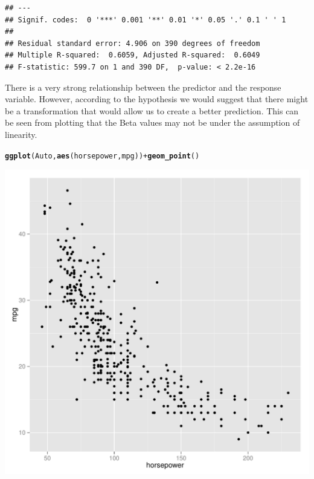 \documentclass{article}\usepackage[]{graphicx}\usepackage[]{color}
\makeatletter
\def\maxwidth{ %
  \ifdim\Gin@nat@width>\linewidth
    \linewidth
  \else
    \Gin@nat@width
  \fi
}
\newcommand{\hlopt}[1]{\textcolor[rgb]{0,0,0}{#1}}%
\newcommand{\hlstd}[1]{\textcolor[rgb]{0.345,0.345,0.345}{#1}}%
\newcommand{\hlkwd}[1]{\textcolor[rgb]{0.737,0.353,0.396}{\textbf{#1}}}%
\newenvironment{kframe}{%
 \def\at@end@of@kframe{}%
 \ifinner\ifhmode%
  \def\at@end@of@kframe{\end{minipage}}%
  \begin{minipage}{\columnwidth}%
 \fi\fi%
 \def\FrameCommand##1{\hskip\@totalleftmargin \hskip-\fboxsep
 \colorbox{shadecolor}{##1}\hskip-\fboxsep
     \hskip-\linewidth \hskip-\@totalleftmargin \hskip\columnwidth}%
 \MakeFramed {\advance\hsize-\width
   \@totalleftmargin\z@ \linewidth\hsize
   \@setminipage}}%
 {\par\unskip\endMakeFramed%
 \at@end@of@kframe}
\newenvironment{knitrout}{}{} %
\makeatother
\begin{document}
\begin{enumerate}[(a)]
\begin{enumerate}[(i)]
\begin{knitrout}
\begin{kframe}
\begin{verbatim}
## ---
## Signif. codes:  0 '***' 0.001 '**' 0.01 '*' 0.05 '.' 0.1 ' ' 1
## 
## Residual standard error: 4.906 on 390 degrees of freedom
## Multiple R-squared:  0.6059,	Adjusted R-squared:  0.6049 
## F-statistic: 599.7 on 1 and 390 DF,  p-value: < 2.2e-16
\end{verbatim}
\end{kframe}
\end{knitrout}
There is a very strong relationship between the predictor and the response variable. However, according to the hypothesis we would suggest that there might be a transformation that would allow us to create a better prediction. This can be seen from plotting that the Beta values may not be under the assumption of linearity.

\begin{knitrout}
\color{fgcolor}\begin{kframe}
\begin{alltt}
\hlkwd{ggplot}\hlstd{(Auto,} \hlkwd{aes}\hlstd{(horsepower, mpg))}\hlopt{+}\hlkwd{geom_point}\hlstd{()}
\end{alltt}
\end{kframe}
\includegraphics[width=\maxwidth]{figure/unnamed-chunk-4-1} 

\end{knitrout}


\end{enumerate}
\end{enumerate}
\end{document}
